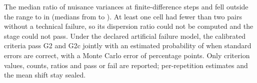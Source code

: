 The median ratio of nuisance variances at finite-difference steps  and  fell outside the range  to  in   (medians from  to ). %
At least one cell had fewer than two pairs without a technical failure, so its dispersion ratio could not be computed and the stage could not pass. %
Under the declared artificial failure model, the calibrated criteria pass G2 and G2c jointly with an estimated probability of  when standard errors are correct, with a Monte Carlo error of  percentage points. %
Only criterion values, counts, ratios and pass or fail are reported; per-repetition estimates and the mean shift stay sealed. %


